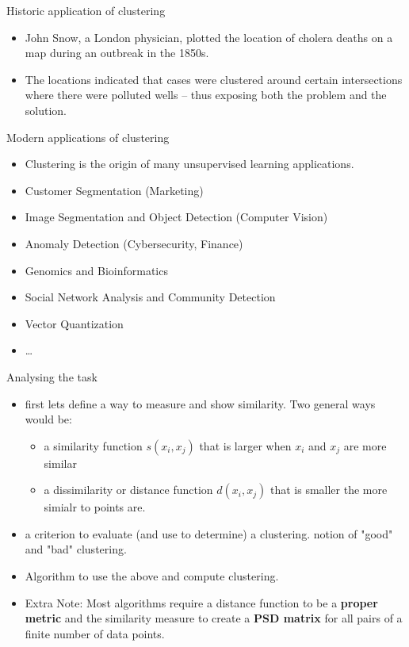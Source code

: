 \documentclass[serif, aspectratio=169]{beamer}
\begin{document}
\begin{frame}{Historic application of clustering}
\begin{itemize}
    \item John Snow, a London physician, plotted the location of cholera deaths on a map during an outbreak in the 1850s.
    \item The locations indicated that cases were clustered around certain intersections where there were polluted wells -- thus exposing both the problem and the solution.
\end{itemize}
    

\end{frame}

\begin{frame}{Modern applications of clustering}
\begin{itemize}
    \item Clustering is the origin of many unsupervised learning applications.
    \item Customer Segmentation (Marketing)
    \item Image Segmentation and Object Detection (Computer Vision)
    \item Anomaly Detection (Cybersecurity, Finance)
    \item Genomics and Bioinformatics
    \item Social Network Analysis and Community Detection
    \item Vector Quantization
    \item \dots
\end{itemize}
    

\end{frame}


\begin{frame}{Analysing the task}
\begin{itemize}
    \item first lets define a way to measure and show similarity. Two general ways would be:
    \begin{itemize}
        \item a similarity function $s(x_i,x_j)$ that is larger when $x_i$ and $x_j$ are more similar
        \item a dissimilarity or distance function $d(x_i,x_j)$ that is smaller the more simialr to points are.
    \end{itemize}
\item  a criterion to evaluate (and use to determine) a clustering. notion of "good" and "bad" clustering.
\item Algorithm to use the above and compute clustering.

            \item Extra Note: Most algorithms require a distance function to be a \textbf{proper metric} and the similarity measure to create a \textbf{PSD matrix} for all pairs of a finite number of data points.
\end{itemize}

    
\end{frame}
\end{document}
